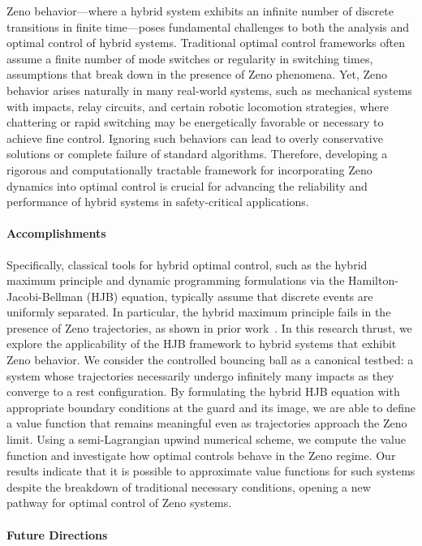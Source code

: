 \documentclass[letterpaper,11pt]{article}
\begin{document}
Zeno behavior—where a hybrid system exhibits an infinite number of discrete transitions in finite time—poses fundamental challenges to both the analysis and optimal control of hybrid systems. 
Traditional optimal control frameworks often assume a finite number of mode switches or regularity in switching times, assumptions that break down in the presence of Zeno phenomena. 
Yet, Zeno behavior arises naturally in many real-world systems, such as mechanical systems with impacts, relay circuits, and certain robotic locomotion strategies, where chattering or rapid switching may be energetically favorable or necessary to achieve fine control. 
Ignoring such behaviors can lead to overly conservative solutions or complete failure of standard algorithms. 
Therefore, developing a rigorous and computationally tractable framework for incorporating Zeno dynamics into optimal control is crucial for advancing the reliability and performance of hybrid systems in safety-critical applications. 

\paragraph{Accomplishments}

Specifically, classical tools for hybrid optimal control, such as the hybrid maximum principle and dynamic programming formulations via the Hamilton-Jacobi-Bellman (HJB) equation, typically assume that discrete events are uniformly separated. 
In particular, the hybrid maximum principle fails in the presence of Zeno trajectories, as shown in prior work~\cite{clark2023optimality}.
In this research thrust, we explore the applicability of the HJB framework to hybrid systems that exhibit Zeno behavior.
We consider the controlled bouncing ball as a canonical testbed: a system whose trajectories necessarily undergo infinitely many impacts as they converge to a rest configuration. 
By formulating the hybrid HJB equation with appropriate boundary conditions at the guard and its image, we are able to define a value function that remains meaningful even as trajectories approach the Zeno limit. 
Using a semi-Lagrangian upwind numerical scheme, we compute the value function and investigate how optimal controls behave in the Zeno regime. 
Our results indicate that it is possible to approximate value functions for such systems despite the breakdown of traditional necessary conditions, opening a new pathway for optimal control of Zeno systems.

\paragraph{Future Directions}
\end{document}
